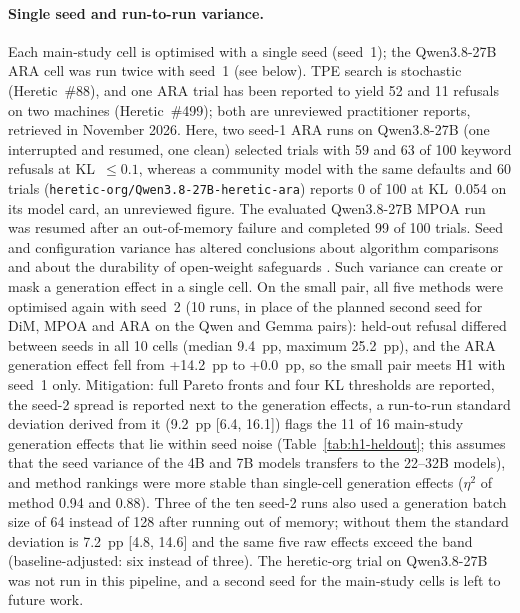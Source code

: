 \paragraph{Single seed and run-to-run variance.}
Each main-study cell is optimised with a single seed (seed~1); the
Qwen3.8-27B ARA cell was run twice with seed~1 (see below). TPE search is stochastic
(Heretic~\#88), and one ARA trial has been reported to yield 52 and 11 refusals
on two machines (Heretic~\#499); both are unreviewed practitioner reports,
retrieved in November 2026. Here, two seed-1 ARA runs on Qwen3.8-27B (one
interrupted and resumed, one clean) selected trials with 59 and 63 of 100
keyword refusals at KL~$\le 0.1$, whereas a community model with the same
defaults and 60 trials (\texttt{heretic-org/Qwen3.8-27B-heretic-ara}) reports
0 of 100 at KL~0.054 on its model card, an unreviewed figure. The evaluated Qwen3.8-27B MPOA run was resumed after an
out-of-memory failure and completed 99 of 100 trials. Seed and configuration
variance has altered conclusions about algorithm comparisons
\cite{bouthillier2021accounting} and about the durability of open-weight
safeguards \cite{qi2025durability}. Such variance can create
or mask a generation effect in a single cell. On the small pair, all five
methods were optimised again with seed~2 (10 runs, in place of the planned
second seed for DiM, MPOA and ARA on the Qwen and Gemma pairs): held-out
refusal differed between seeds in all 10 cells (median 9.4~pp, maximum
25.2~pp), and the ARA generation effect fell from +14.2~pp to +0.0~pp, so
the small pair meets H1 with seed~1 only. Mitigation: full Pareto fronts and
four KL thresholds are reported, the seed-2 spread is reported next to the
generation effects, a run-to-run standard deviation derived from it (9.2~pp
[6.4, 16.1]) flags the 11 of 16 main-study generation effects that lie within
seed noise (Table~\ref{tab:h1-heldout}; this assumes that the seed variance of
the 4B and 7B models transfers to the 22--32B models), and method rankings were
more stable than single-cell generation effects ($\eta^2$ of method 0.94 and
0.88). Three of the ten seed-2 runs also used a generation batch size of 64
instead of 128 after running out of memory; without them the standard
deviation is 7.2~pp [4.8, 14.6] and the same five raw effects exceed the band
(baseline-adjusted: six instead of three). The heretic-org trial on
Qwen3.8-27B was not run in this pipeline, and a second seed for the
main-study cells is left to future work.

